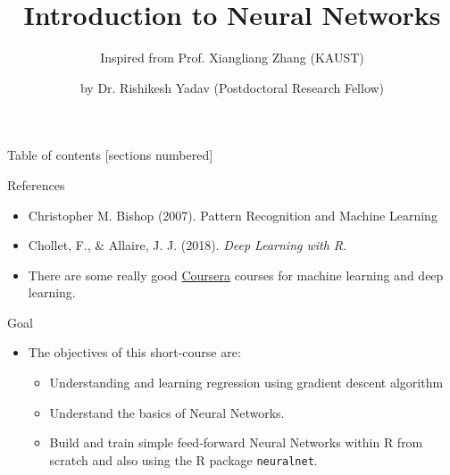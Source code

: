 \documentclass[10pt, hyperref={colorlinks = true,linkcolor = blue}]{beamer}
\title{Introduction to Neural Networks}
\subtitle{Inspired from Prof. Xiangliang Zhang (KAUST) }
\date{}
\author{by Dr. Rishikesh Yadav (Postdoctoral Research Fellow)}
\institute{HEC Montr\'eal, McGill University, Canada}
\begin{document}
\maketitle

\begin{frame}{Table of contents}
  [sections numbered]
  \tableofcontents%
\end{frame}



\begin{frame}[fragile]{References}
        \begin{itemize}
        \item Christopher M. Bishop (2007).
Pattern Recognition and Machine Learning
            \item Chollet, F., \& Allaire, J. J. (2018). \emph{Deep Learning with R}.
            \item There are some really good \href{https://www.coursera.org/}{Coursera} courses for machine learning and deep learning.
        \end{itemize}
\end{frame}

\begin{frame}{Goal}
\begin{itemize}
    \item The objectives of this short-course are:
    \begin{itemize}
    \item Understanding and learning regression using gradient descent algorithm 
        \item Understand the basics of Neural Networks.
        \item Build and train simple feed-forward Neural Networks within R from scratch and also using the R package \texttt{neuralnet}.
    \end{itemize}
\end{itemize}

\end{frame}
\end{document}
